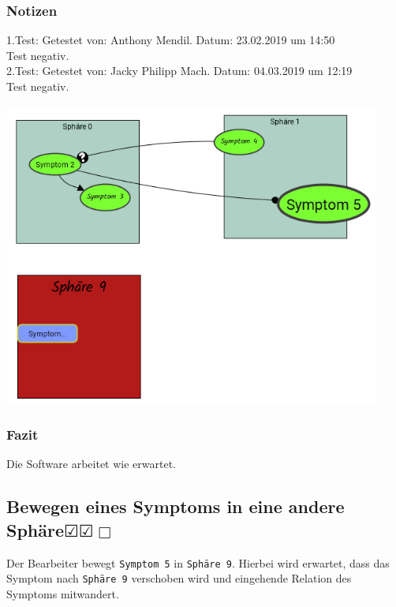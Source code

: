 \documentclass[enabledeprecatedfontcommands]{scrartcl}
\newcommand{\subsectiont}[2]{\subsection[#1]{#1{\normalsize\normalfont #2}}}
\newcommand{\leer}{$\Box$}
\newcommand{\ok}{$\CheckedBox$}
\begin{document}
\subsubsection{Notizen}
1.Test: Getestet von: Anthony Mendil. Datum: 23.02.2019 um 14:50 \\
Test negativ.\\
2.Test: Getestet von: Jacky Philipp Mach. Datum: 04.03.2019 um 12:19 \\
Test negativ.
\begin{center}
\includegraphics[height=10cm]{2_30.PNG}
\end{center}
\subsubsection{Fazit}
Die Software arbeitet wie erwartet.

\subsectiont{Bewegen eines Symptoms in eine andere Sphäre}{\dotfill\ok\ok\leer}
Der Bearbeiter bewegt \texttt{Symptom 5} in \texttt{Sphäre 9}. Hierbei wird erwartet, dass das Symptom nach \texttt{Sphäre 9} verschoben wird und eingehende Relation des Symptoms mitwandert. 
\end{document}
